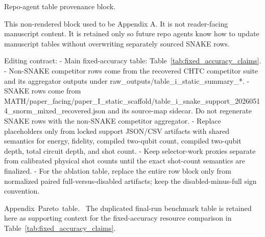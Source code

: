 \documentclass[
  reprint,
  amsmath,
  amssymb,
  aps,
  pra,
  nofootinbib,
  superscriptaddress,
  floatfix
]{revtex4-2}
\newcommand{\tentative}[1]{\textcolor{red!70!black}{#1}}
\newcommand{\structlabel}[1]{\noindent\mbox{\tentative{#1.}}~}
\begin{document}
\clearpage
\appendix

\iffalse
Repo-agent table provenance block.

This non-rendered block used to be Appendix A. It is not reader-facing
manuscript content. It is retained only so future repo agents know how to
update manuscript tables without overwriting separately sourced SNAKE rows.

Editing contract:
- Main fixed-accuracy table: Table~\ref{tab:fixed_accuracy_claims}.
- Non-SNAKE competitor rows come from the recovered CHTC competitor suite and
  its aggregator outputs under raw_outputs/table_i_static_summary_*.
- SNAKE rows come from
  MATH/paper_facing/paper_I_static_scaffold/table_i_snake_support_20260514_snorm_mixed_recovered.json
  and its source-map sidecar. Do not regenerate SNAKE rows with the non-SNAKE
  competitor aggregator.
- Replace placeholders only from locked support JSON/CSV artifacts with shared
  semantics for energy, fidelity, compiled two-qubit count, compiled two-qubit
  depth, total circuit depth, and shot count.
- Keep selector-work proxies separate from calibrated physical shot counts
  until the exact shot-count semantics are finalized.
- For the ablation table, replace the entire row block only from normalized
  paired full-versus-disabled artifacts; keep the disabled-minus-full sign
  convention.

\structlabel{Appendix Pareto table}
The duplicated final-run benchmark table is retained here as supporting context for the fixed-accuracy resource comparison in Table~\ref{tab:fixed_accuracy_claims}.
\end{document}
